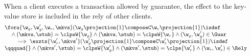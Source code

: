 \begin{lemma}
\label{lem:locality-update}
\label{lem:appendix-locality-update}
When a client executes a transaction allowed by guarantee, the effect to the key-value store is included in the rely of other clients.
\[
\begin{array}{@{}l}
    \fora{\w_g, \w_g', \w_r, \mkvs} (\w_g\projection{1} \composeC \w_r\projection{1} )\isdef \\
    \quad {} \land (\mkvs, \stub) = \clpsW{\w_g} \land  (\mkvs, \stub) = \clpsW{\w_r} \land (\w_g, \w_g') \in \Guar  \\
    \qquad \implies \exsts{\w_r', \mkvs'} (\w_g'\projection{1} \composeC \w_r'\projection{1})\isdef \\
    \qqquad {} \land (\mkvs', \stub) = \clpsW{\w_g'} \land  (\mkvs', \stub) = \clps{\w_r'} \land (\w_r, \w_r') \in \Rely 
\end{array} 
\]
\end{lemma}
